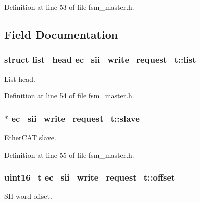 \-Definition at line 53 of file fsm\-\_\-master.\-h.



\subsection{\-Field \-Documentation}
\subsubsection[{list}]{\setlength{\rightskip}{0pt plus 5cm}struct list\-\_\-head {\bf ec\-\_\-sii\-\_\-write\-\_\-request\-\_\-t\-::list}}\label{structec__sii__write__request__t_a08c68d50c7e2fecfff3d1f54ede50b60}


\-List head. 



\-Definition at line 54 of file fsm\-\_\-master.\-h.

\subsubsection[{slave}]{$\ast$ {\bf ec\-\_\-sii\-\_\-write\-\_\-request\-\_\-t\-::slave}}\label{structec__sii__write__request__t_a1fb11a824ca776c9725157703c64a351}


\-Ether\-C\-A\-T slave. 



\-Definition at line 55 of file fsm\-\_\-master.\-h.

\subsubsection[{offset}]{\setlength{\rightskip}{0pt plus 5cm}uint16\-\_\-t {\bf ec\-\_\-sii\-\_\-write\-\_\-request\-\_\-t\-::offset}}\label{structec__sii__write__request__t_a9b70af97dacc5056389bcde6ac1cf107}


\-S\-I\-I word offset. 



